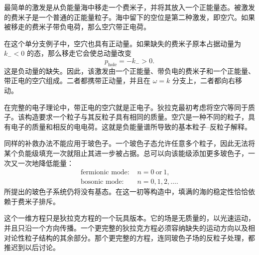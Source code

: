 最简单的激发是从负能量海中移走一个费米子，并将其放入一个正能量态。被激发的费米子是一个普通的正能量粒子。海中留下的空位是第二种激发，即空穴。如果被移走的费米子带负电荷，那么空穴带正电荷。

在这个单分支例子中，空穴也具有正动量。如果缺失的费米子原本占据动量为 \(k_-<0\) 的态，那么移走它会使总动量改变
\begin{equation}
p_{\mathrm{hole}}=-k_->0.
\end{equation}
这是负动量的缺失。因此，该激发由一个正能量、带负电的费米子和一个正能量、带正电的空穴组成。二者都携带正动量，并且在 \(\omega=k\) 分支上，二者都向右移动。

在完整的电子理论中，带正电的空穴就是正电子。狄拉克最初考虑将空穴等同于质子。该构造要求一个粒子与其反粒子具有相同的质量。空穴是一种不同的粒子，具有电子的质量和相反的电电荷。这就是负能量谱所导致的基本粒子--反粒子解释。

同样的补救办法不能应用于玻色子。一个玻色子态允许任意多个粒子，因此无法将某个负能级填充一次就阻止其进一步被占据。总可以向该能级添加更多玻色子，一次又一次地降低能量：
\begin{equation}
\begin{aligned}
\text{fermionic mode: }&n=0\ \text{or}\ 1,\\
\text{bosonic mode: }&n=0,1,2,\ldots .
\end{aligned}
\end{equation}
所提出的玻色子系统仍将没有基态。在这一初等构造中，填满的海的稳定性恰恰依赖于费米子排斥。

这个一维方程只是狄拉克方程的一个玩具版本。它的场是无质量的，以光速运动，并且只沿一个方向传播。一个更完整的狄拉克方程必须容纳缺失的运动方向以及相对论性粒子结构的其余部分。那个更完整的方程，连同玻色子场的反粒子处理，都推迟到以后讨论。
